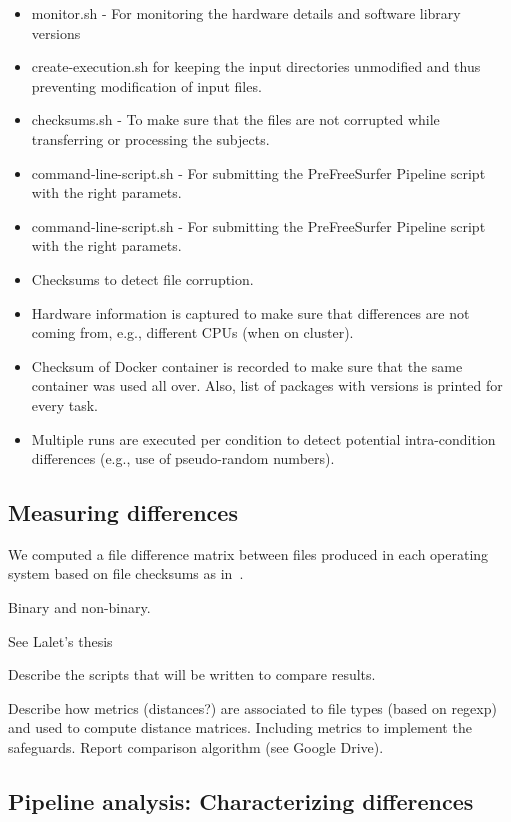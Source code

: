 \documentclass{article}
\begin{document}
\begin{itemize}
  \item monitor.sh - For monitoring the hardware details and software library versions
  \item create-execution.sh for keeping the input directories unmodified and thus preventing modification of input files.
  \item checksums.sh - To make sure that the files are not corrupted while transferring or processing the subjects.
  \item command-line-script.sh - For submitting the PreFreeSurfer Pipeline script with the right paramets.
  \item command-line-script.sh - For submitting the PreFreeSurfer Pipeline script with the right paramets.
  \item Checksums to detect file corruption.
  \item Hardware information is captured to make sure that differences are not coming from, e.g., different CPUs (when on cluster).
  \item Checksum of Docker container is recorded to make sure that the same container was used all over. Also, list of packages with versions is printed for every task. 
  \item Multiple runs are executed per condition to detect potential intra-condition differences (e.g., use of pseudo-random numbers).
\end{itemize}

\subsection{Measuring differences}

 We computed a file difference matrix between files produced in each
 operating system based on file checksums as in~\cite{Scaria2017}.

Binary and non-binary.

See Lalet's thesis

Describe the scripts that will be written to compare results.

Describe how metrics (distances?) are associated to file types (based
on regexp) and used to compute distance matrices. Including metrics to
implement the safeguards. Report comparison algorithm (see Google
Drive).


\subsection{Pipeline analysis: Characterizing differences}
\end{document}
